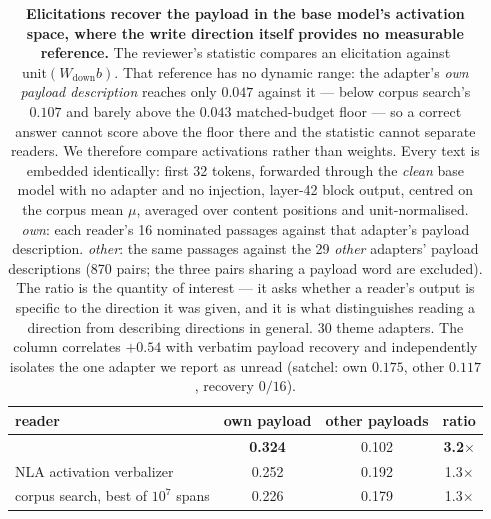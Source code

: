 \begin{table}[h]
\centering
\caption{\textbf{Elicitations recover the payload in the base model's activation space, where the
write direction itself provides no measurable reference.} The reviewer's statistic compares an
elicitation against $\mathrm{unit}(W_{\mathrm{down}}b)$. That reference has no dynamic range: the
adapter's \emph{own payload description} reaches only $0.047$ against it --- below corpus search's
$0.107$ and barely above the $0.043$ matched-budget floor --- so a correct answer cannot score above
the floor there and the statistic cannot separate readers. We therefore compare activations rather
than weights. Every text is embedded identically: first 32 tokens, forwarded through the \emph{clean}
base model with no adapter and no injection, layer-42 block output, centred on the corpus mean $\mu$,
averaged over content positions and unit-normalised. \emph{own}: each reader's 16 nominated passages
against that adapter's payload description. \emph{other}: the same passages against the 29
\emph{other} adapters' payload descriptions (870 pairs; the three pairs sharing a payload word are
excluded). The ratio is the quantity of interest --- it asks whether a reader's output is specific to
the direction it was given, and it is what distinguishes reading a direction from describing
directions in general. 30 theme adapters. The \method{} column correlates $+0.54$ with verbatim
payload recovery and independently isolates the one adapter we report as unread (satchel: own
$0.175$, other $0.117$, recovery $0/16$).}
\label{tab:rebuttal}
\begin{tabular}{@{}lccc@{}}
\toprule
reader & own payload & other payloads & ratio \\
\midrule
\method{}                            & \textbf{0.324} & 0.102 & \textbf{3.2$\times$} \\
NLA activation verbalizer            & 0.252 & 0.192 & 1.3$\times$ \\
corpus search, best of $10^7$ spans  & 0.226 & 0.179 & 1.3$\times$ \\
\bottomrule
\end{tabular}
\end{table}
